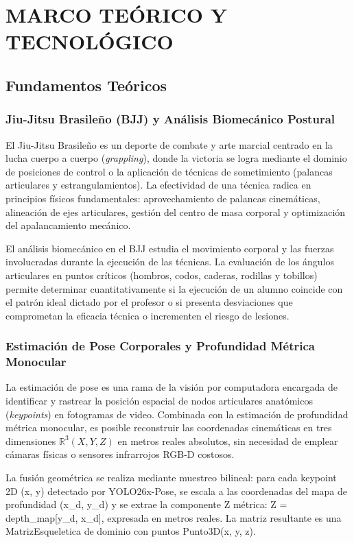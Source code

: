 \chapter{MARCO TEÓRICO Y TECNOLÓGICO}

\section{Fundamentos Teóricos}

\subsection{Jiu-Jitsu Brasileño (BJJ) y Análisis Biomecánico Postural}
El Jiu-Jitsu Brasileño es un deporte de combate y arte marcial centrado en la lucha cuerpo a cuerpo (\textit{grappling}), donde la victoria se logra mediante el dominio de posiciones de control o la aplicación de técnicas de sometimiento (palancas articulares y estrangulamientos). La efectividad de una técnica radica en principios físicos fundamentales: aprovechamiento de palancas cinemáticas, alineación de ejes articulares, gestión del centro de masa corporal y optimización del apalancamiento mecánico.

El análisis biomecánico en el BJJ estudia el movimiento corporal y las fuerzas involucradas durante la ejecución de las técnicas. La evaluación de los ángulos articulares en puntos críticos (hombros, codos, caderas, rodillas y tobillos) permite determinar cuantitativamente si la ejecución de un alumno coincide con el patrón ideal dictado por el profesor o si presenta desviaciones que comprometan la eficacia técnica o incrementen el riesgo de lesiones.

\subsection{Estimación de Pose Corporales y Profundidad Métrica Monocular}
La estimación de pose es una rama de la visión por computadora encargada de identificar y rastrear la posición espacial de nodos articulares anatómicos (\textit{keypoints}) en fotogramas de video. Combinada con la estimación de profundidad métrica monocular, es posible reconstruir las coordenadas cinemáticas en tres dimensiones $\mathbb{R}^3 (X, Y, Z)$ en metros reales absolutos, sin necesidad de emplear cámaras físicas o sensores infrarrojos RGB-D costosos.

La fusión geométrica se realiza mediante muestreo bilineal: para cada keypoint 2D (x, y) detectado por YOLO26x-Pose, se escala a las coordenadas del mapa de profundidad (x\_d, y\_d) y se extrae la componente Z métrica: Z = depth\_map[y\_d, x\_d], expresada en metros reales. La matriz resultante es una MatrizEsqueletica de dominio con puntos Punto3D(x, y, z).

